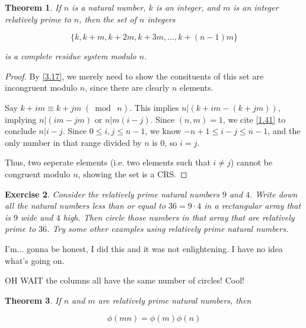 \documentclass{article}
\newtheorem{thm}{Theorem}[section]
\newtheorem{ex}[thm]{Exercise}
\numberwithin{equation}{thm}
\providecommand{\gmod}[1]{\; (\bmod \; #1)}
\begin{document}
\begin{thm} \label{6.21}
  If $n$ is a natural number, $k$ is an integer, and $m$ is an integer relatively prime to $n$, then the set of $n$ integers

  $$\{k, k+m, k+2m, k+3m, \ldots, k + (n-1)m\}$$

  is a complete residue system modulo $n$.
\end{thm}

\begin{proof}
  By \ref{3.17}, we merely need to show the consituents of this set are incongruent modulo $n$, since there are clearly $n$ elements.

  Say $k + im \equiv k + jm \gmod n$. This implies $n | (k+im - (k+jm))$, implying $n | (im - jm)$ or $n | m(i-j)$. Since $(n, m) = 1$, we cite \ref{1.41} to conclude $n | i-j$. Since $0 \leq i, j \leq n-1$, we know $-n+1 \leq i-j \leq n-1$, and the only number in that range divided by $n$ is $0$, so $i = j$.

  Thus, two seperate elements (i.e. two elements such that $i \neq j$) cannot be congruent modulo $n$, showing the set is a CRS.
\end{proof}



\begin{ex} \label{6.22}
  Consider the relatively prime natural numbers $9$ and $4$. Write down all the natural numbers less than or equal to $36 = 9 \cdot 4$ in a rectangular array that is $9$ wide and $4$ high. Then circle those numbers in that array that are relatively prime to $36$. Try some other examples using relatively prime natural numbers.
\end{ex}

I'm... gonna be honest, I did this and it was not enlightening. I have no idea what's going on.

OH WAIT the columns all have the same number of circles! Cool!



\begin{thm} \label{6.23}
  If $n$ and $m$ are relatively prime natural numbers, then

  $$\phi(mn) = \phi(m)\phi(n)$$
\end{thm}
\end{document}
